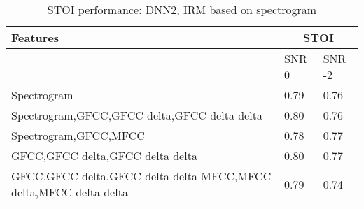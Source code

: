 \begin{enumerate}
\begin{itemize}
\begin{table}[!htbp]
\centering
\begin{tabular}{ |p{12cm}|p{1.7cm}|p{1.7cm}|  }
\hline
\textbf{Features} & \multicolumn{2}{|c|}{\textbf{STOI}} \\
\hline
\cellcolor{black} & SNR 0 & SNR -2\\
\hline
Spectrogram	& 0.79	& 0.76\\
\hline
Spectrogram,GFCC,GFCC delta,GFCC delta delta	& 0.80	& 0.76\\
\hline
Spectrogram,GFCC,MFCC	& 0.78	& 0.77\\
\hline
\rowcolor[HTML]{ADD8E6}GFCC,GFCC delta,GFCC delta delta	& 0.80	& 0.77\\
\hline
GFCC,GFCC delta,GFCC delta delta MFCC,MFCC delta,MFCC delta delta	& 0.79	& 0.74\\
\hline
\end{tabular}
\caption{STOI performance: DNN2, IRM based on spectrogram}
\label{tab:dnn_1_stoi_1}
\end{table}


\end{itemize}
\end{enumerate}
